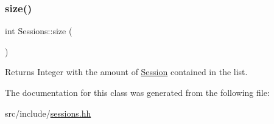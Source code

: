 \subsubsection{\texorpdfstring{size()}{size()}}
{\footnotesize\ttfamily int Sessions\+::size (\begin{DoxyParamCaption}{ }\end{DoxyParamCaption})}

\begin{DoxyReturn}{Returns}
Integer with the amount of \hyperlink{classSession}{Session} contained in the list. 
\end{DoxyReturn}


The documentation for this class was generated from the following file\+:\begin{DoxyCompactItemize}
\item 
src/include/\hyperlink{sessions_8hh}{sessions.\+hh}\end{DoxyCompactItemize}
